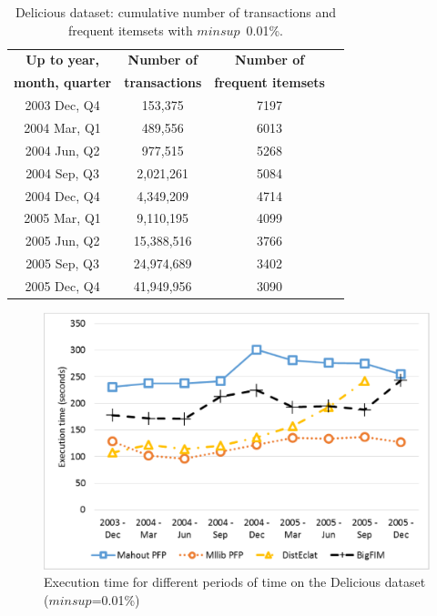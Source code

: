 \documentclass[preprint,review,12pt]{elsarticle}
\begin{document}
\begin{table}[h]
\scriptsize
\begin{center}
\caption{Delicious dataset: cumulative number of transactions and frequent itemsets
with $minsup$~0.01\%.}
\label{delicious_itemsets}
\begin{tabular}{|c|c|c|c|}
\hline
{\bf Up to year,}	& {\bf Number of} 	& {\bf	Number of} \\
{\bf month, quarter}	& {\bf transactions} 	& {\bf	frequent itemsets} \\
\hline \hline
2003 Dec, Q4 	& 153,375	 	& 7197 \\ \hline
2004 Mar, Q1  	& 489,556		& 6013 \\ \hline
2004 Jun, Q2	& 977,515		& 5268 \\ \hline
2004 Sep, Q3 	& 2,021,261		& 5084 \\ \hline
2004 Dec, Q4 	& 4,349,209		& 4714 \\ \hline
2005 Mar, Q1	& 9,110,195		& 4099 \\ \hline
2005 Jun, Q2	& 15,388,516		& 3766 \\ \hline
2005 Sep, Q3	& 24,974,689		& 3402 \\ \hline
2005 Dec, Q4	& 41,949,956		& 3090 \\ \hline
\end{tabular}
\end{center}
\end{table}

\begin{figure}[!t]
\includegraphics[width=5in]{delicious.eps}
\caption{Execution time for different periods of time on the Delicious dataset
($minsup$=0.01\%)}
\label{delicious}
\end{figure}
\end{document}
